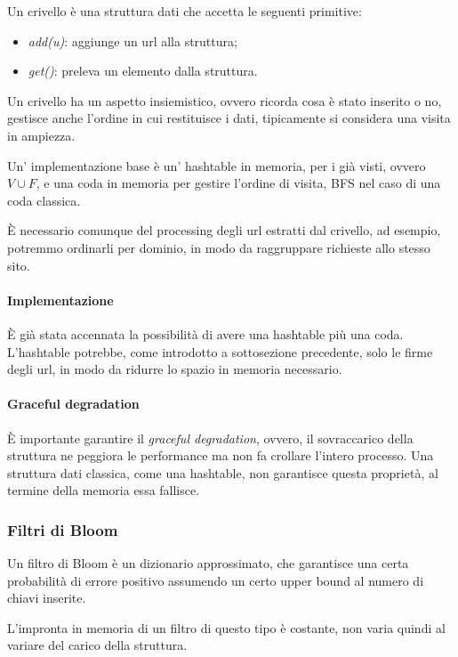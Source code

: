 Un crivello è una struttura dati che accetta le seguenti primitive: 
\begin{itemize}
    \item \emph{add(u)}: aggiunge un url alla struttura;
    \item \emph{get()}: preleva un elemento dalla struttura. 
\end{itemize}
Un crivello ha un aspetto insiemistico, ovvero ricorda cosa è stato inserito 
o no, gestisce anche l'ordine in cui restituisce i dati, tipicamente 
si considera una visita in ampiezza. 

Un' implementazione base è un' hashtable in memoria, per i già visti, ovvero $V \cup F$, 
e una coda in memoria per gestire l'ordine di visita, BFS nel caso di una coda classica.

\begin{remark}
    È necessario comunque del processing degli url estratti dal crivello, ad esempio, 
    potremmo ordinarli per dominio, in modo da raggruppare richieste allo stesso sito.
\end{remark}

\paragraph{Implementazione}
È già stata accennata la possibilità di avere una hashtable più una coda. 
L'hashtable potrebbe, come introdotto a sottosezione precedente, solo le firme degli url, in modo da ridurre lo spazio in memoria necessario.

\paragraph{Graceful degradation}
È importante garantire il \emph{graceful degradation}, ovvero, il sovraccarico della 
struttura ne peggiora le performance ma non fa crollare l'intero processo. 
Una struttura dati classica, come una hashtable, non garantisce questa proprietà, 
al termine della memoria essa fallisce.

\subsubsection{Filtri di Bloom}
Un filtro di Bloom è un dizionario approssimato, che garantisce una certa probabilità di errore positivo assumendo un certo upper bound al numero di chiavi inserite. 

L'impronta in memoria di un filtro di questo tipo è costante, non varia quindi al variare 
del carico della struttura.

